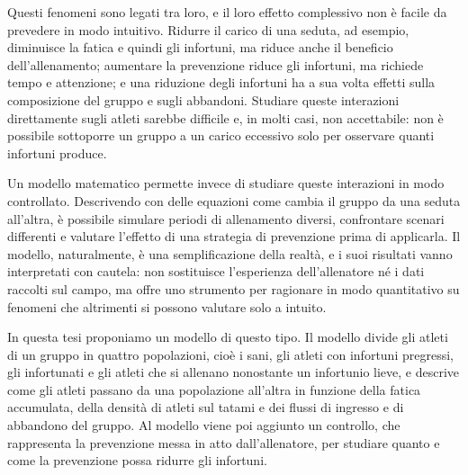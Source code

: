 Questi fenomeni sono legati tra loro, e il loro effetto complessivo non è facile da prevedere in modo intuitivo. Ridurre il carico di una seduta, ad esempio, diminuisce la fatica e quindi gli infortuni, ma riduce anche il beneficio dell'allenamento; aumentare la prevenzione riduce gli infortuni, ma richiede tempo e attenzione; e una riduzione degli infortuni ha a sua volta effetti sulla composizione del gruppo e sugli abbandoni. Studiare queste interazioni direttamente sugli atleti sarebbe difficile e, in molti casi, non accettabile: non è possibile sottoporre un gruppo a un carico eccessivo solo per osservare quanti infortuni produce. \par

Un modello matematico permette invece di studiare queste interazioni in modo controllato. Descrivendo con delle equazioni come cambia il gruppo da una seduta all'altra, è possibile simulare periodi di allenamento diversi, confrontare scenari differenti e valutare l'effetto di una strategia di prevenzione prima di applicarla. Il modello, naturalmente, è una semplificazione della realtà, e i suoi risultati vanno interpretati con cautela: non sostituisce l'esperienza dell'allenatore né i dati raccolti sul campo, ma offre uno strumento per ragionare in modo quantitativo su fenomeni che altrimenti si possono valutare solo a intuito. \par

In questa tesi proponiamo un modello di questo tipo. Il modello divide gli atleti di un gruppo in quattro popolazioni, cioè i sani, gli atleti con infortuni pregressi, gli infortunati e gli atleti che si allenano nonostante un infortunio lieve, e descrive come gli atleti passano da una popolazione all'altra in funzione della fatica accumulata, della densità di atleti sul tatami e dei flussi di ingresso e di abbandono del gruppo. Al modello viene poi aggiunto un controllo, che rappresenta la prevenzione messa in atto dall'allenatore, per studiare quanto e come la prevenzione possa ridurre gli infortuni.